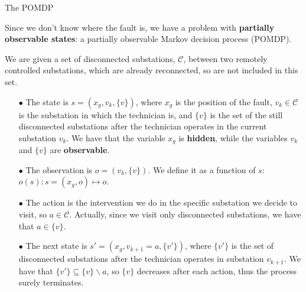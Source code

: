 \documentclass[10pt, aspectratio=169, compress, protectframetitle, handout]{beamer}
\begin{document}
\begin{frame}{The POMDP}

Since we don't know where the fault is, we have a problem with \textbf{partially observable states}: a \alert{partially observable Markov decision process (POMDP)}.

We are given a set of disconnected substations, $\mathcal C$, between two remotely controlled substations, which are already reconnected, so are not included in this set.

    \begin{itemize}
        \item[\alert{$\bullet$}] The \alert{state} is $s = (x_g, v_k, \{v\})$, where $x_g$ is the position of the fault, $v_k \in \mathcal C$ is the substation in which the technician is, and $\{v\}$ is the set of the still disconnected substations after the technician operates in the current substation $v_k$. We have that the variable $x_g$ is \textbf{hidden}, while the variables $v_k$ and $\{v\}$ are \textbf{observable}.\smallskip
        
        \item[\alert{$\bullet$}] The \alert{observation} is $o = (v_k, \{v\})$. We define it as a function of $s$: $o(s): s = (x_g, o ) \mapsto o$.\smallskip
        
        \item[\alert{$\bullet$}] The \alert{action} is the intervention we do in the specific substation we decide to visit, so $a \in \mathcal C$. Actually, since we visit only disconnected substations, we have that $a \in \{v\}$.\smallskip
        
        \item[\alert{$\bullet$}] The \alert{next state} is $s' = (x_g, v_{k+1} = a, \{v'\})$, where $\{v'\}$ is the set of disconnected substations after the technician operates in substation $v_{k+1}$. We have that $\{v'\} \subseteq \{v\} \backslash a$, so $\{v\}$ decreases after each action, thus the process surely terminates.
    \end{itemize}
    
\end{frame}
\end{document}
